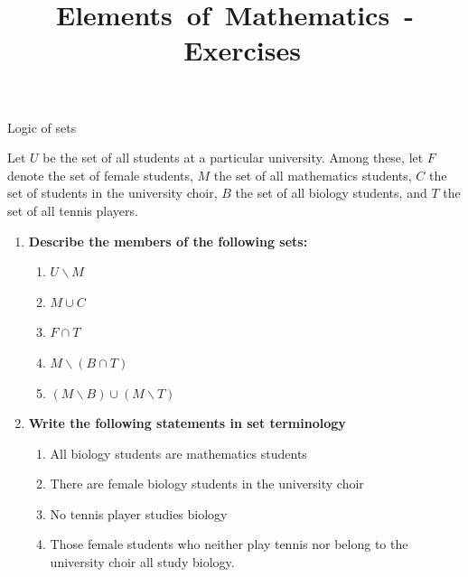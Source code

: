 \documentclass[9pt]{beamer}
\title{\huge \mbox{Elements of Mathematics - Exercises}}
\begin{document}
\maketitle

\begin{frame}{Logic of sets}

    Let $U$ be the set of all students at a particular university. Among these, let $F$ denote the set of female students, $M$ the set of all mathematics students, $C$ the set of students in the university choir, $B$ the set of all biology students, and $T$ the set of all tennis players. 

    \begin{enumerate}[leftmargin = 0.5cm, label = $\bullet$, rightmargin = 0.2cm]
        \item[(a)] \textbf{Describe the members of the following sets:}
        \begin{enumerate}[leftmargin = 0.5cm, label = $\bullet$, rightmargin = 0.2cm]
        \item[(i)] $U \backslash M$
        \item[(ii)] $M \cup C$
        \item[(iii)] $F \cap T$
        \item[(iv)]  $M \backslash (B \cap T)$
        \item[(v)] $(M \backslash B) \cup (M \backslash T)$
    \end{enumerate}
        \item[(b)] \textbf{Write the following statements in set terminology}
    \begin{enumerate}[leftmargin = 0.5cm, label = $\bullet$, rightmargin = 0.2cm]
        \item[(i)] All biology students are mathematics students
        \item[(ii)] There are female biology students in the university choir
        \item[(iii)] No tennis player studies biology
        \item[(iv)] Those female students who neither play tennis nor belong to the university choir all study biology.    
    \end{enumerate}
    \end{enumerate}
    
\end{frame}
\end{document}

